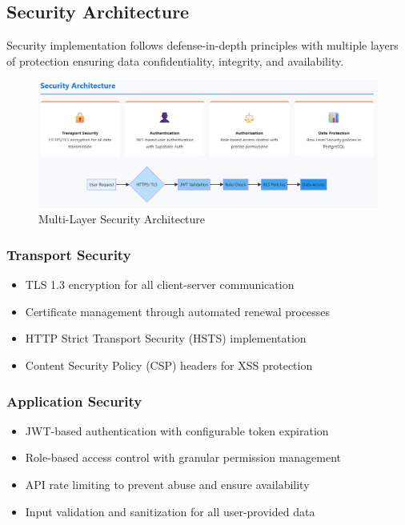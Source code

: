 \subsection{Security Architecture}

Security implementation follows defense-in-depth principles with multiple layers of protection ensuring data confidentiality, integrity, and availability.

\begin{figure}[H]
    \centering
    \includegraphics[width=1\linewidth]{img/chap_02/security_architecture.png}
    \caption{Multi-Layer Security Architecture}
    \label{fig:security_architecture}
\end{figure}

\subsubsection{Transport Security}
\begin{itemize}
\item TLS 1.3 encryption for all client-server communication
\item Certificate management through automated renewal processes
\item HTTP Strict Transport Security (HSTS) implementation
\item Content Security Policy (CSP) headers for XSS protection
\end{itemize}

\subsubsection{Application Security}
\begin{itemize}
\item JWT-based authentication with configurable token expiration
\item Role-based access control with granular permission management
\item API rate limiting to prevent abuse and ensure availability
\item Input validation and sanitization for all user-provided data
\end{itemize}

